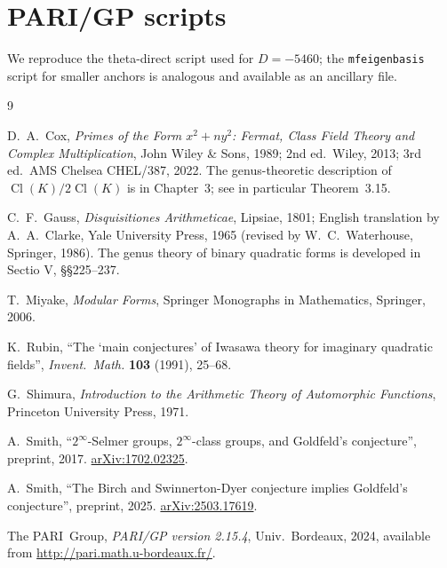 \documentclass[11pt]{amsart}
\theoremstyle{definition}
\theoremstyle{remark}
\DeclareMathOperator{\Cl}{Cl}
\begin{document}
\section{PARI/GP scripts}\label{app:scripts}

We reproduce the theta-direct script used for \(D = -5460\); the
\texttt{mfeigenbasis} script for smaller anchors is analogous and
available as an ancillary file.




\begin{thebibliography}{9}

D.~A.~Cox, \emph{Primes of the Form \(x^2 + n y^2\):
Fermat, Class Field Theory and Complex Multiplication}, John Wiley
\& Sons, 1989; 2nd ed.\ Wiley, 2013; 3rd ed.\ AMS Chelsea CHEL/387,
2022. The genus-theoretic description of \(\Cl(K)/2\Cl(K)\) is in
Chapter~3; see in particular Theorem~3.15.

C.~F.~Gauss, \emph{Disquisitiones Arithmeticae}, Lipsiae, 1801; English
translation by A.~A.~Clarke, Yale University Press, 1965 (revised by
W.~C.~Waterhouse, Springer, 1986). The genus theory of binary
quadratic forms is developed in Sectio V, \S\S 225--237.

T.~Miyake, \emph{Modular Forms}, Springer Monographs in Mathematics,
Springer, 2006.

K.~Rubin, ``The `main conjectures' of Iwasawa theory for imaginary
quadratic fields'', \emph{Invent.\ Math.} \textbf{103} (1991), 25--68.

G.~Shimura, \emph{Introduction to the Arithmetic Theory of Automorphic
Functions}, Princeton University Press, 1971.

A.~Smith, ``\(2^{\infty}\)-Selmer groups, \(2^{\infty}\)-class groups,
and Goldfeld's conjecture'', preprint, 2017.
\href{https://arxiv.org/abs/1702.02325}{arXiv:1702.02325}.

A.~Smith, ``The Birch and Swinnerton-Dyer conjecture implies Goldfeld's
conjecture'', preprint, 2025.
\href{https://arxiv.org/abs/2503.17619}{arXiv:2503.17619}.

The PARI~Group, \emph{PARI/GP version 2.15.4}, Univ.~Bordeaux, 2024,
available from \url{http://pari.math.u-bordeaux.fr/}.

\end{thebibliography}
\end{document}
